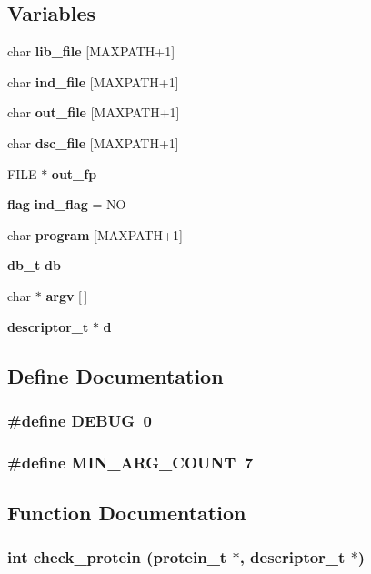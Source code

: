 \subsection*{Variables}
\begin{CompactItemize}
\item 
char {\bf lib\_\-file} [MAXPATH+1]
\item 
char {\bf ind\_\-file} [MAXPATH+1]
\item 
char {\bf out\_\-file} [MAXPATH+1]
\item 
char {\bf dsc\_\-file} [MAXPATH+1]
\item 
FILE $\ast$ {\bf out\_\-fp}
\item 
{\bf flag} {\bf ind\_\-flag} = NO
\item 
char {\bf program} [MAXPATH+1]
\item 
{\bf db\_\-t} {\bf db}
\item 
char $\ast$ {\bf argv} [$\,$]
\item 
{\bf descriptor\_\-t} $\ast$ {\bf d}
\end{CompactItemize}


\subsection{Define Documentation}
\subsubsection{\setlength{\rightskip}{0pt plus 5cm}\#define DEBUG\ 0}\label{Pilar__5_8c_a1}


\subsubsection{\setlength{\rightskip}{0pt plus 5cm}\#define MIN\_\-ARG\_\-COUNT\ 7}\label{Pilar__5_8c_a0}




\subsection{Function Documentation}
\subsubsection{\setlength{\rightskip}{0pt plus 5cm}int check\_\-protein ({\bf protein\_\-t} $\ast$, {\bf descriptor\_\-t} $\ast$)}\label{Pilar__5_8c_a16}



